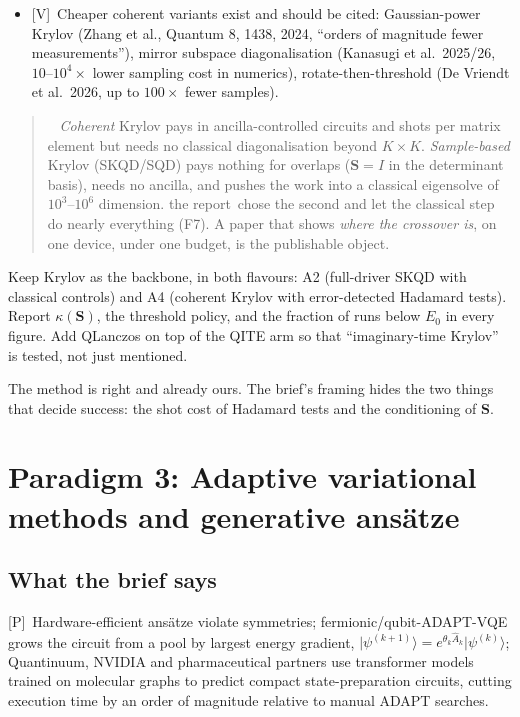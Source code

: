 \documentclass[11pt,a4paper]{article}
\newcommand{\ket}[1]{\lvert #1\rangle}
\newcommand{\report}{the report}
\newcommand{\lP}{\textcolor{keyblue}{[P]}}   %
\newcommand{\lV}{\textcolor{keyblue}{[V]}}   %
\newenvironment{idea}[1][Main idea]{\par\smallskip\begin{quotation}\noindent{\bfseries\textcolor{keyblue}{#1.}}\ }{\end{quotation}\smallskip}
\newcommand{\takeaway}[1]{\par\smallskip\noindent{\bfseries\textcolor{keyblue}{Takeaway.}} #1\par\smallskip}
\newcommand{\verdict}[1]{\par\smallskip\noindent{\bfseries\textcolor{keyblue}{Verdict for our paper.}} #1\par\smallskip}
\begin{document}
\begin{itemize}
\item \lV\ Cheaper coherent variants exist and should be cited: Gaussian-power Krylov (Zhang et al., Quantum 8, 1438, 2024, ``orders of magnitude fewer measurements''), mirror subspace diagonalisation (Kanasugi et al.\ 2025/26, $10$--$10^4\times$ lower sampling cost in numerics), rotate-then-threshold (De Vriendt et al.\ 2026, up to $100\times$ fewer samples).
\end{itemize}

\begin{idea}[Two Krylov flavours, two cost profiles]
\emph{Coherent} Krylov pays in ancilla-controlled circuits and shots per matrix element but needs no classical diagonalisation beyond $K\times K$. \emph{Sample-based} Krylov (SKQD/SQD) pays nothing for overlaps ($\mathbf S=I$ in the determinant basis), needs no ancilla, and pushes the work into a classical eigensolve of $10^3$--$10^6$ dimension. \report\ chose the second and let the classical step do nearly everything (F7). A paper that shows \emph{where the crossover is}, on one device, under one budget, is the publishable object.
\end{idea}

\verdict{Keep Krylov as the backbone, in both flavours: A2 (full-driver SKQD with classical controls) and A4 (coherent Krylov with error-detected Hadamard tests). Report $\kappa(\mathbf S)$, the threshold policy, and the fraction of runs below $E_0$ in every figure. Add QLanczos on top of the QITE arm so that ``imaginary-time Krylov'' is tested, not just mentioned.}

\takeaway{The method is right and already ours. The brief's framing hides the two things that decide success: the shot cost of Hadamard tests and the conditioning of $\mathbf S$.}

\section{Paradigm 3: Adaptive variational methods and generative ans\"atze}\label{sec:p3}

\subsection{What the brief says}
\lP\ Hardware-efficient ans\"atze violate symmetries; fermionic/qubit-ADAPT-VQE grows the circuit from a pool by largest energy gradient, $\ket{\psi^{(k+1)}}=e^{\theta_k\hat A_k}\ket{\psi^{(k)}}$; Quantinuum, NVIDIA and pharmaceutical partners use transformer models trained on molecular graphs to predict compact state-preparation circuits, cutting execution time by an order of magnitude relative to manual ADAPT searches.
\end{document}

